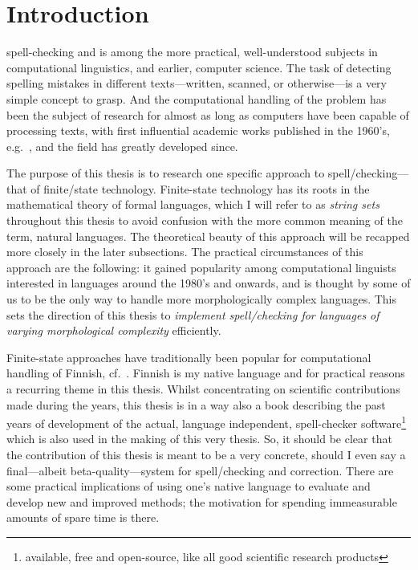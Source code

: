 \documentclass[officiallayout]{unihelcompling}
\begin{document}

\printglossaries

\chapter{Introduction}
\label{chap:introduction}

\Gls{spell-checking} and  is among the
more practical, well-understood subjects in \gls{computational linguistics},
and earlier, computer science.  The task of detecting spelling mistakes in
different texts---written, scanned, or otherwise---is a very simple concept to
grasp. And the computational handling of the problem has been the subject of
research for almost as long as computers have been capable of processing texts,
with first influential academic works published in the 1960's,
e.g.~\cite{damerau1964technique}, and the field has greatly developed since.

The purpose of this thesis is to research one specific approach to
spell\-/checking---that of finite\-/state technology. Finite-state technology
has its roots in the mathematical theory of \glspl{formal language}, which I
will refer to as \emph{string sets} throughout this thesis to avoid confusion
with the more common meaning of the term, \glspl{natural language}. The
theoretical beauty of this approach will be recapped more closely in the later
subsections.  The practical circumstances of this approach are the following:
it gained popularity among computational linguists interested in
 languages around the
1980's and onwards, and is thought by some of us to be the only way to handle
more morphologically complex languages. This sets the direction of this thesis
to \emph{implement spell\-/checking for languages of varying morphological
complexity} efficiently.

Finite-state approaches have traditionally been popular for computational
handling of Finnish, cf.~\citet{koskenniemi1983twolevel}. Finnish is my native
language and for practical reasons a recurring theme in this thesis. Whilst
concentrating on scientific contributions made during the years, this thesis is
in a way also a book describing the past years of development of the actual,
language independent, \gls{spell-checker} software\footnote{available, free and
open-source, like all good scientific research products} which is also used in
the making of this very thesis. So, it should be clear that the contribution of
this thesis is meant to be a very concrete, should I even say a final---albeit
beta-quality---system for spell\-/checking and correction.  There are some
practical implications of using one's native language to evaluate and develop
new and improved methods; the motivation for spending immeasurable amounts of
spare time is there.
\end{document}
